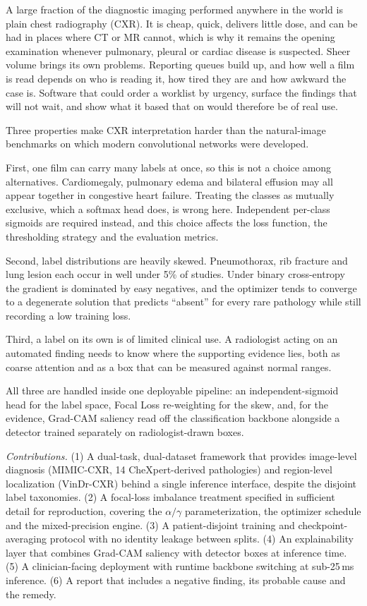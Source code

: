 \documentclass[conference]{IEEEtran}
\begin{document}
A large fraction of the diagnostic imaging performed anywhere in the world is
plain chest radiography (CXR). It is cheap, quick, delivers little dose, and can
be had in places where CT or MR cannot, which is why it remains the opening
examination whenever pulmonary, pleural or cardiac disease is suspected. Sheer
volume brings its own problems. Reporting queues build up, and how well a film
is read depends on who is reading it, how tired they are and how awkward the
case is. Software that could order a worklist by urgency, surface the findings
that will not wait, and show what it based that on would therefore be of real
use.

Three properties make CXR interpretation harder than the natural-image
benchmarks on which modern convolutional networks were developed.

First, one film can carry many labels at once, so this is not a choice among
alternatives. Cardiomegaly, pulmonary edema and bilateral effusion may all appear
together in congestive heart failure. Treating the classes as mutually exclusive,
which a softmax head does, is wrong here. Independent per-class sigmoids
are required instead, and this choice affects the loss function, the
thresholding strategy and the evaluation metrics.

Second, label distributions are heavily skewed. Pneumothorax, rib fracture and
lung lesion each occur in well under 5\% of studies. Under binary cross-entropy
the gradient is dominated by easy negatives, and the optimizer tends to
converge to a degenerate solution that predicts ``absent'' for every rare
pathology while still recording a low training loss.

Third, a label on its own is of limited clinical use. A radiologist acting on
an automated finding needs to know where the supporting evidence lies, both as
coarse attention and as a box that can be measured against normal ranges.

All three are handled inside one deployable pipeline: an independent-sigmoid
head for the label space, Focal Loss re-weighting for the skew, and, for the
evidence, Grad-CAM saliency read off the classification backbone alongside a
detector trained separately on radiologist-drawn boxes.

\textit{Contributions.} (1) A dual-task, dual-dataset framework that provides
image-level diagnosis (MIMIC-CXR, 14 CheXpert-derived pathologies) and
region-level localization (VinDr-CXR) behind a single inference interface,
despite the disjoint label taxonomies. (2) A focal-loss imbalance treatment
specified in sufficient detail for reproduction, covering the $\alpha/\gamma$
parameterization, the optimizer schedule and the mixed-precision engine. (3) A
patient-disjoint training and checkpoint-averaging protocol with no identity
leakage between splits. (4) An explainability layer that combines Grad-CAM
saliency with detector boxes at inference time. (5) A clinician-facing
deployment with runtime backbone switching at sub-25\,ms inference. (6) A report that includes a negative
finding, its probable cause and the remedy.
\end{document}
